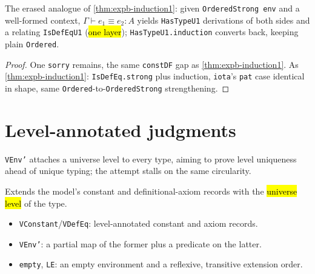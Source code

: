 \begin{lemma}
\label{thm:expb-inductionu1}
\leanok
{}

 The erased analogue of \ref{thm:expb-induction1}: given \texttt{OrderedStrong env}
and a well-formed context, $\Gamma\vdash e_1\equiv e_2:A$ yields \texttt{HasTypeU1} derivations of
both sides and a relating \texttt{IsDefEqU1} (\hl{one layer}); \texttt{HasTypeU1.induction} converts
back, keeping plain \texttt{Ordered}.
\end{lemma}
\begin{proof}
\stSorry{} One \texttt{sorry} remains, the same \texttt{constDF} gap as \ref{thm:expb-induction1}.
 As \ref{thm:expb-induction1}: \texttt{IsDefEq.strong} plus induction, \texttt{iota}'s
\texttt{pat} case identical in shape, same \texttt{Ordered}-to-\texttt{OrderedStrong}
strengthening.
\end{proof}

\section{Level-annotated judgments}

\texttt{VEnv'} attaches a universe level to every type, aiming to prove level uniqueness ahead of
unique typing; the attempt stalls on the same circularity.

\begin{definition}
\label{structure:expb-venvprime}
\leanok
{}

 Extends the model's constant and definitional-axiom records with the \hl{universe
level} of the type.
\begin{itemize}
\item \texttt{VConstant}/\texttt{VDefEq}: level-annotated constant and axiom records.
\item \texttt{VEnv'}: a partial map of the former plus a predicate on the latter.
\item \texttt{empty}, \texttt{LE}: an empty environment and a reflexive, transitive extension order.
\end{itemize}
\end{definition}

